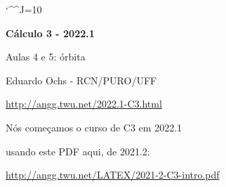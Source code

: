 \documentclass[oneside,12pt]{article}
\begin{document}
\catcode`\^^J=10
\pu
\def\pictgridstyle{\color{GrayPale}\linethickness{0.3pt}}
\def\pictaxesstyle{\linethickness{0.5pt}}
\celllower=2.5pt


\def\u#1{\par{\footnotesize \url{#1}}}

\def\drafturl{http://angg.twu.net/LATEX/2022-1-C3.pdf}
\def\drafturl{http://angg.twu.net/2022.1-C3.html}
\def\draftfooter{\tiny \href{\drafturl}{\jobname{}} \ColorBrown{\shorttoday{} \hours}}



%

\thispagestyle{empty}

\begin{center}

\vspace*{1.2cm}

{\bf \Large Cálculo 3 - 2022.1}

\bsk

Aulas 4 e 5: órbita

\bsk

Eduardo Ochs - RCN/PURO/UFF

\url{http://angg.twu.net/2022.1-C3.html}

\end{center}

\newpage


Nós começamos o curso de C3 em 2022.1

usando este PDF aqui, de 2021.2:

\ssk

{\footnotesize

\url{http://angg.twu.net/LATEX/2021-2-C3-intro.pdf}

}
\end{document}
